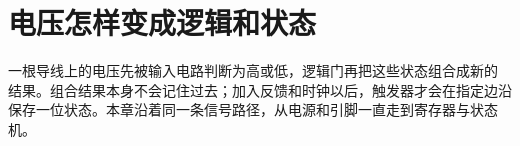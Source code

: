 \chapter{电压怎样变成逻辑和状态}

一根导线上的电压先被输入电路判断为高或低，逻辑门再把这些状态组合成新的
结果。组合结果本身不会记住过去；加入反馈和时钟以后，触发器才会在指定边沿
保存一位状态。本章沿着同一条信号路径，从电源和引脚一直走到寄存器与状态机。





